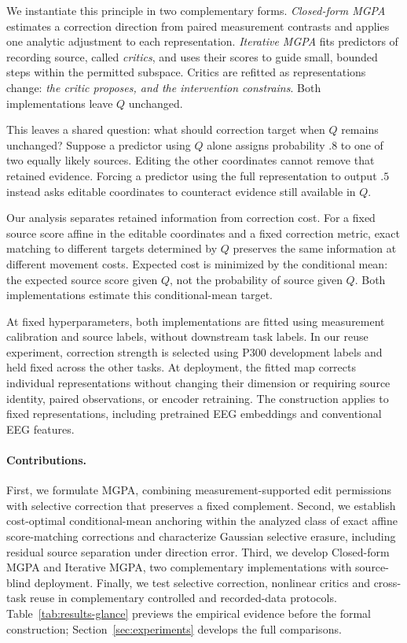 \documentclass{article}
\theoremstyle{plain}
\theoremstyle{definition}
\begin{document}
We instantiate this principle in two complementary forms. \emph{Closed-form MGPA}
estimates a correction direction from paired measurement contrasts and applies
one analytic adjustment to each representation. \emph{Iterative MGPA} fits
predictors of recording source, called \emph{critics}, and uses their scores to
guide small, bounded steps within the permitted subspace. Critics are refitted
as representations change: \emph{the critic proposes, and the intervention
constrains}. Both implementations leave $Q$ unchanged.

This leaves a shared question: what should correction target when $Q$ remains
unchanged? Suppose a predictor using $Q$ alone assigns probability $.8$ to one
of two equally likely sources. Editing the other coordinates cannot remove
that retained evidence. Forcing a predictor using the full representation to
output $.5$ instead asks editable coordinates to counteract evidence still
available in $Q$.

Our analysis separates retained information from correction cost.
For a fixed source score affine in the editable coordinates and a fixed
correction metric, exact matching to different targets determined by $Q$
preserves the same information at different movement costs. Expected cost
is minimized by the conditional mean: the expected source score given $Q$,
not the probability of source given $Q$. Both implementations estimate this
conditional-mean target.

At fixed hyperparameters, both implementations are fitted using measurement
calibration and source labels, without downstream task labels. In our reuse
experiment, correction strength is selected using P300 development labels and
held fixed across the other tasks. At deployment, the fitted map corrects
individual representations without changing their dimension or requiring source
identity, paired observations, or encoder retraining. The construction applies
to fixed representations, including pretrained EEG embeddings and conventional
EEG features.

\paragraph{Contributions.}
First, we formulate MGPA, combining measurement-supported edit permissions
with selective correction that preserves a fixed complement. Second, we
establish cost-optimal conditional-mean anchoring within the analyzed class of
exact affine score-matching corrections and characterize Gaussian selective
erasure, including residual source separation under direction error.
Third, we develop Closed-form MGPA and
Iterative MGPA, two complementary implementations with source-blind deployment.
Finally, we test selective correction, nonlinear critics and cross-task reuse
in complementary controlled and recorded-data protocols.
Table~\ref{tab:results-glance} previews the empirical evidence before the
formal construction; Section~\ref{sec:experiments} develops the full comparisons.
\end{document}
